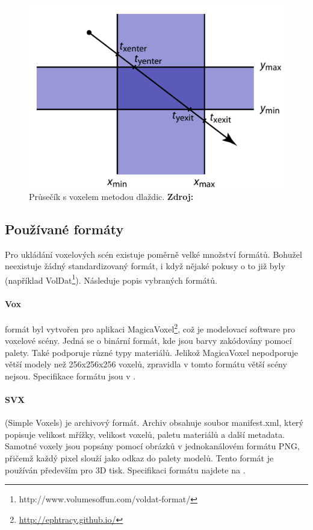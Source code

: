 \begin{figure}[H]
	\centering
	\includegraphics[scale=1.3]{obrazky-figures/slab_intersect.png}
	\caption{Průsečík s voxelem metodou dlaždic. \textbf{Zdroj: \cite{Cunha13}}}
	\label{fig:slabs}
\end{figure}


\subsection{Používané formáty}
Pro ukládání voxelových scén existuje poměrně velké množství formátů. Bohužel neexistuje žádný standardizovaný formát, i když nějaké pokusy o to již byly (například VolDat\footnote{http://www.volumesoffun.com/voldat-format/}). Následuje popis vybraných formátů.

\paragraph{Vox} formát byl vytvořen pro aplikaci MagicaVoxel\footnote{\url{http://ephtracy.github.io/}}, což je modelovací software pro voxelové scény. Jedná se o binární formát, kde jsou barvy zakódovány pomocí palety. Také podporuje různé typy materiálů. Jelikož MagicaVoxel nepodporuje větší modely než 256x256x256 voxelů, zpravidla v tomto formátu větší scény nejsou. Specifikace formátu jsou v \cite{vox_format}.

\paragraph{SVX} (Simple Voxels) je archivový formát. Archiv obsahuje soubor manifest.xml, který popisuje velikost mřížky, velikost voxelů, paletu materiálů a další metadata. Samotné voxely jsou popsány pomocí obrázků v jednokanálovém formátu PNG, přičemž každý pixel slouží jako odkaz do palety modelů. Tento formát je používán především pro 3D tisk. Specifikaci formátu najdete na \cite{svx_format_2014}.


